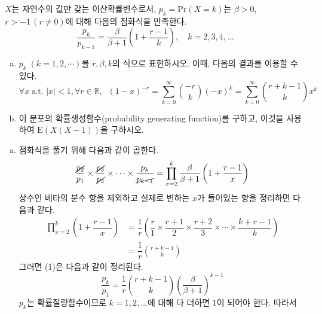 \documentclass[answers]{exam}
\begin{document}
\newpage
{}
\begin{questions}
  \question
  $X$는 자연수의 값만 갖는 이산확률변수로서, $p_{k}=\mathrm{Pr}\left(X=k\right)$는 $\beta>0$, $r>-1\,\left(r\neq0\right)$에 대해 다음의 점화식을 만족한다.
  $$
    \dfrac{p_{k}}{p_{k-1}} = \dfrac{\beta}{\beta+1}\left(1+\dfrac{r-1}{k}\right),\quad k=2,3,4,\ldots
  $$
  \begin{enumerate}[(a)]
    \item $p_{k}\;\left(k=1,2,\cdots\right)$를 $r,\beta,k$의 식으로 표현하시오. 이때, 다음의 결과를 이용할 수 있다.
    $$
      \forall x \text{ s.t. }\left|x\right|<1, \forall r\in\mathbb{R},\;\; \left(1-x\right)^{-r}=\sum_{k=0}^{\infty}{{-r}\choose{k}}\left(-x\right)^{k}=\sum_{k=0}^{\infty}{{r+k-1}\choose{k}}x^{k}
    $$
    \item 이 분포의 확률생성함수(probability generating function)를 구하고, 이것을 사용하여 $\mathrm{E}\left(X\left(X-1\right)\right)$을 구하시오.
  \end{enumerate}
  \begin{solution}
    \begin{enumerate}[(a)]
      \item 점화식을 풀기 위해 다음과 같이 곱한다.
      \begin{equation}
        \dfrac{\cancel{p_{2}}}{p_{1}}\times \dfrac{\cancel{p_{3}}}{\cancel{p_{2}}}\times \cdots \times \dfrac{p_{k}}{\cancel{p_{k-1}}} = \prod_{x=2}^{k}\dfrac{\beta}{\beta+1}\left(1+\dfrac{r-1}{x}\right)
      \end{equation}
      상수인 베타의 분수 항을 제외하고 실제로 변하는 $x$가 들어있는 항을 정리하면 다음과 같다.
      \begin{align}
        \prod_{x=2}^{k}\left(1+\dfrac{r-1}{x}\right)&= \dfrac{1}{r}\left(\dfrac{r}{1}\times \dfrac{r+1}{2}\times \dfrac{r+2}{3}\times \cdots \times \dfrac{k+r-1}{k}\right)\\
        &= \dfrac{1}{r}{{r+k-1}\choose{k}}
      \end{align}
      그러면 (1)은 다음과 같이 정리된다.
      \begin{equation}
        \dfrac{p_{k}}{p_{1}} = \dfrac{1}{r}{{r+k-1}\choose{k}}\left(\dfrac{\beta}{\beta+1}\right)^{k-1}
      \end{equation}
      $p_{k}$는 확률질량함수이므로 $k=1,2,\ldots$에 대해 다 더하면 $1$이 되어야 한다. 따라서

\end{enumerate}
\end{solution}
\end{questions}
\end{document}
